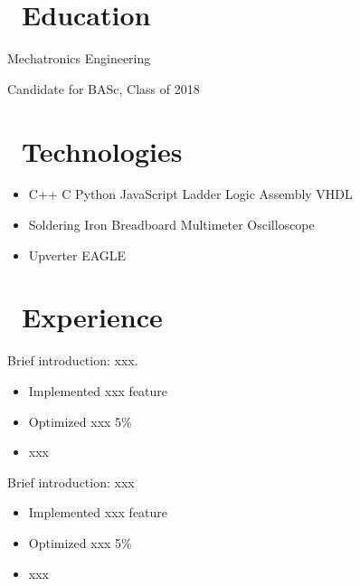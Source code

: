 \documentclass{resume}
\begin{document}


 
\section{\faGraduationCap\ Education}
Mechatronics Engineering\par
Candidate for BASc, Class of 2018

\section{\faCogs\ Technologies}
\begin{itemize}[parsep=0.5ex]
  \item %
  C++\textperiodcentered 
  C\textperiodcentered 
  Python\textperiodcentered 
  JavaScript\textperiodcentered
  Ladder Logic\textperiodcentered
  Assembly\textperiodcentered
  VHDL
  \item %
  Soldering Iron\textperiodcentered
  Breadboard\textperiodcentered
  Multimeter\textperiodcentered
  Oscilloscope
  \item %
  Upverter\textperiodcentered
  EAGLE
\end{itemize}

\section{\faUsers\ Experience}
Brief introduction: xxx.
\begin{itemize}
  \item Implemented xxx feature
  \item Optimized xxx 5\%
  \item xxx
\end{itemize}

Brief introduction: xxx
\begin{itemize}
  \item Implemented xxx feature
  \item Optimized xxx 5\%
  \item xxx
\end{itemize}
\end{document}
